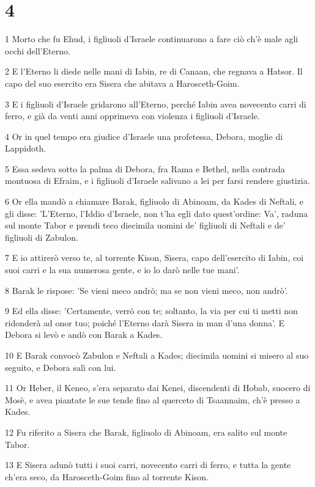 \chapter{4}

\par 1 Morto che fu Ehud, i figliuoli d'Israele continuarono a fare ciò ch'è male agli occhi dell'Eterno.
\par 2 E l'Eterno li diede nelle mani di Iabin, re di Canaan, che regnava a Hatsor. Il capo del suo esercito era Sisera che abitava a Harosceth-Goim.
\par 3 E i figliuoli d'Israele gridarono all'Eterno, perché Iabin avea novecento carri di ferro, e già da venti anni opprimeva con violenza i figliuoli d'Israele.
\par 4 Or in quel tempo era giudice d'Israele una profetessa, Debora, moglie di Lappidoth.
\par 5 Essa sedeva sotto la palma di Debora, fra Rama e Bethel, nella contrada montuosa di Efraim, e i figliuoli d'Israele salivano a lei per farsi rendere giustizia.
\par 6 Or ella mandò a chiamare Barak, figliuolo di Abinoam, da Kades di Neftali, e gli disse: 'L'Eterno, l'Iddio d'Israele, non t'ha egli dato quest'ordine: Va', raduna sul monte Tabor e prendi teco diecimila uomini de' figliuoli di Neftali e de' figliuoli di Zabulon.
\par 7 E io attirerò verso te, al torrente Kison, Sisera, capo dell'esercito di Iabin, coi suoi carri e la sua numerosa gente, e io lo darò nelle tue mani'.
\par 8 Barak le rispose: 'Se vieni meco andrò; ma se non vieni meco, non andrò'.
\par 9 Ed ella disse: 'Certamente, verrò con te; soltanto, la via per cui ti metti non ridonderà ad onor tuo; poiché l'Eterno darà Sisera in man d'una donna'. E Debora si levò e andò con Barak a Kades.
\par 10 E Barak convocò Zabulon e Neftali a Kades; diecimila uomini si misero al suo seguito, e Debora salì con lui.
\par 11 Or Heber, il Keneo, s'era separato dai Kenei, discendenti di Hobab, suocero di Mosè, e avea piantate le sue tende fino al querceto di Tsaannaim, ch'è presso a Kades.
\par 12 Fu riferito a Sisera che Barak, figliuolo di Abinoam, era salito sul monte Tabor.
\par 13 E Sisera adunò tutti i suoi carri, novecento carri di ferro, e tutta la gente ch'era seco, da Harosceth-Goim fino al torrente Kison.
